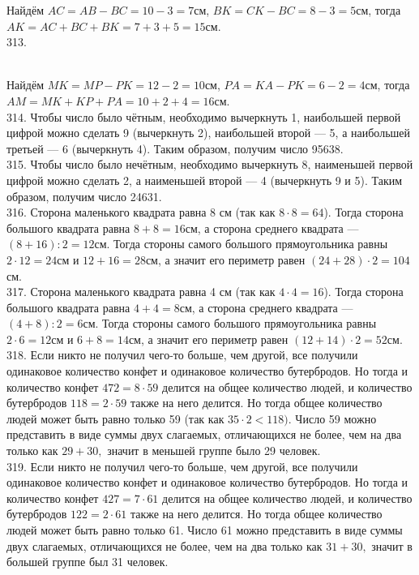 Найдём $AC=AB-BC=10-3=7$см, $BK=CK-BC=8-3=5$см, тогда $AK=AC+BC+BK=7+3+5=15$см.\\
313. \begin{figure}[ht!]
\end{figure}\\
Найдём $MK=MP-PK=12-2=10$см, $PA=KA-PK=6-2=4$см, тогда $AM=MK+KP+PA=10+2+4=16$см.\\
314. Чтобы число было чётным, необходимо вычеркнуть 1, наибольшей первой цифрой можно сделать 9 (вычеркнуть 2), наибольшей второй --- 5, а наибольшей третьей --- 6 (вычеркнуть 4). Таким образом, получим число 95638.\\
315. Чтобы число было нечётным, необходимо вычеркнуть 8, наименьшей первой цифрой можно сделать 2, а наименьшей второй --- 4 (вычеркнуть 9 и 5). Таким образом, получим число 24631.\\
316. Сторона маленького квадрата равна 8 см (так как $8\cdot8=64$). Тогда сторона большого квадрата равна $8+8=16$см, а сторона среднего квадрата --- $(8+16):2=12$см. Тогда стороны самого большого прямоугольника равны $2\cdot12=24$см и $12+16=28$см, а значит его периметр равен $(24+28)\cdot2=104$см.\\
317. Сторона маленького квадрата равна 4 см (так как $4\cdot4=16$). Тогда сторона большого квадрата равна $4+4=8$см, а сторона среднего квадрата --- $(4+8):2=6$см. Тогда стороны самого большого прямоугольника равны $2\cdot6=12$см и $6+8=14$см, а значит его периметр равен $(12+14)\cdot2=52$см.\\
318. Если никто не получил чего-то больше, чем другой, все получили одинаковое количество конфет и одинаковое количество бутербродов. Но тогда и количество конфет $472=8\cdot59$ делится на общее количество людей, и количество бутербродов $118=2\cdot59$ также на него делится. Но тогда общее количество людей может быть равно только 59 (так как $35\cdot2<118).$ Число 59 можно представить в виде суммы двух слагаемых, отличающихся не более, чем на два только как $29+30,$ значит в меньшей группе было 29 человек.\\
319. Если никто не получил чего-то больше, чем другой, все получили одинаковое количество конфет и одинаковое количество бутербродов. Но тогда и количество конфет $427=7\cdot61$ делится на общее количество людей, и количество бутербродов $122=2\cdot61$ также на него делится. Но тогда общее количество людей может быть равно только 61.  Число 61 можно представить в виде суммы двух слагаемых, отличающихся не более, чем на два только как $31+30,$ значит в большей группе был 31 человек.\\
